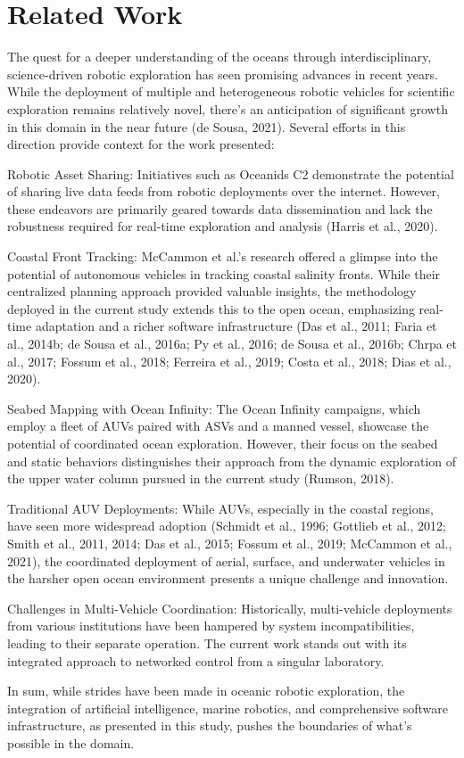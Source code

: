 \section{Related Work}
\label{sec:related}


The quest for a deeper understanding of the oceans through interdisciplinary, science-driven robotic exploration has seen promising advances in recent years. While the deployment of multiple and heterogeneous robotic vehicles for scientific exploration remains relatively novel, there's an anticipation of significant growth in this domain in the near future (de Sousa, 2021). Several efforts in this direction provide context for the work presented:

Robotic Asset Sharing: Initiatives such as Oceanids C2 demonstrate the potential of sharing live data feeds from robotic deployments over the internet. However, these endeavors are primarily geared towards data dissemination and lack the robustness required for real-time exploration and analysis (Harris et al., 2020).

Coastal Front Tracking: McCammon et al.'s research offered a glimpse into the potential of autonomous vehicles in tracking coastal salinity fronts. While their centralized planning approach provided valuable insights, the methodology deployed in the current study extends this to the open ocean, emphasizing real-time adaptation and a richer software infrastructure (Das et al., 2011; Faria et al., 2014b; de Sousa et al., 2016a; Py et al., 2016; de Sousa et al., 2016b; Chrpa et al., 2017; Fossum et al., 2018; Ferreira et al., 2019; Costa et al., 2018; Dias et al., 2020).

Seabed Mapping with Ocean Infinity: The Ocean Infinity campaigns, which employ a fleet of AUVs paired with ASVs and a manned vessel, showcase the potential of coordinated ocean exploration. However, their focus on the seabed and static behaviors distinguishes their approach from the dynamic exploration of the upper water column pursued in the current study (Rumson, 2018).

Traditional AUV Deployments: While AUVs, especially in the coastal regions, have seen more widespread adoption (Schmidt et al., 1996; Gottlieb et al., 2012; Smith et al., 2011, 2014; Das et al., 2015; Fossum et al., 2019; McCammon et al., 2021), the coordinated deployment of aerial, surface, and underwater vehicles in the harsher open ocean environment presents a unique challenge and innovation.

Challenges in Multi-Vehicle Coordination: Historically, multi-vehicle deployments from various institutions have been hampered by system incompatibilities, leading to their separate operation. The current work stands out with its integrated approach to networked control from a singular laboratory.

In sum, while strides have been made in oceanic robotic exploration, the integration of artificial intelligence, marine robotics, and comprehensive software infrastructure, as presented in this study, pushes the boundaries of what's possible in the domain.
